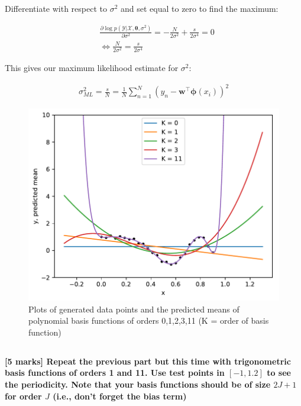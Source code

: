 \documentclass[12pt,twoside]{article}
\begin{document}
Differentiate with respect to $\sigma^2$ and set equal to zero to find the maximum:

\begin{align}
    & \frac{\partial \operatorname{log} p(\mathcal{Y} | \mathcal{X}, \boldsymbol{\theta}, \sigma^2)}{\partial \sigma^2} = -\frac{N}{2\sigma^2} + \frac{s}{2\sigma^4} = 0 \\
    & \iff \frac{N}{2\sigma^2} = \frac{s}{2\sigma^4}
\end{align}

This gives our maximum likelihood estimate for $\sigma^2$:

\begin{align}
    \sigma^2_{ML} = \frac{s}{N} = \frac{1}{N}\sum^{N}_{n=1} (y_n - \mathbf{w}^\top \boldsymbol{\phi}(x_i))^2
\end{align}

\begin{figure}[h]
\centering %
\includegraphics[width = 0.9\hsize] {./figures/polynomial.pdf}
\caption{Plots of generated data points and the predicted means of polynomial basis functions of orders 0,1,2,3,11 (K = order of basis function)}%
\label{fig:poly}
\end{figure}





\subsection{}
\textbf{[5 marks] Repeat the previous part but this time with trigonometric basis functions of orders 1 and 11. Use test points in $[-1, 1.2]$ to see the periodicity. Note that your basis functions should be of size $2J + 1$ for order $J$ (i.e., don’t forget the bias term)}
\\
\end{document}
